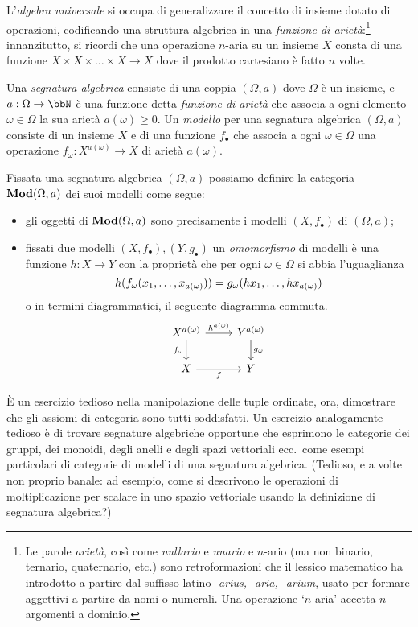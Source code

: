 L'\emph{algebra universale} si occupa di generalizzare il concetto di insieme dotato di operazioni, codificando una struttura algebrica in una \emph{funzione di arietà}:\footnote{Le parole \emph{arietà}, così come \emph{nullario} e \emph{unario} e \(n\)-ario (ma non binario, ternario, quaternario, etc.) sono retroformazioni che il lessico matematico ha introdotto a partire dal suffisso latino \emph{-\={a}rius, -\=aria, -\=arium}, usato per formare aggettivi a partire da nomi o numerali. Una operazione `\(n\)-aria' accetta \(n\) argomenti a dominio.} innanzitutto, si ricordi che una operazione \(n\)-aria su un insieme \(X\) consta di una funzione \(X\times X\times\dots\times X \to X\) dove il prodotto cartesiano è fatto \(n\) volte.
\begin{example}\label{ex_cat_sigma_strutture}
	Una \emph{segnatura algebrica} consiste di una coppia \((\Omega, a)\) dove \(\Omega\) è un insieme, e \(a : \Omega \to \bbN\) è una funzione detta \emph{funzione di arietà} che associa a ogni elemento \(\omega \in \Omega\) la sua arietà \(a(\omega)\ge 0\). Un \emph{modello} per una segnatura algebrica \((\Omega,a)\) consiste di un insieme \(X\) e di una funzione \(f_\bullet\) che associa a ogni \(\omega\in\Omega\) una operazione \(f_\omega : X^{a(\omega)} \to X\) di arietà \(a(\omega)\).

	Fissata una segnatura algebrica \((\Omega,a)\) possiamo definire la categoria \(\mathbf{Mod}(\Omega,a)\) dei suoi modelli come segue:
	\begin{itemize}
		\item gli oggetti di \(\mathbf{Mod}(\Omega,a)\) sono precisamente i modelli \((X,f_\bullet)\) di \((\Omega,a)\);
		\item fissati due modelli \((X,f_\bullet), (Y,g_\bullet)\) un \emph{omomorfismo} di modelli è una funzione \(h : X\to Y\) con la proprietà che per ogni \(\omega\in\Omega\) si abbia l'uguaglianza
		      \[h(f_\omega(\tup x{a(\omega)},)) = g_\omega(\tup {hx}{a(\omega)},)\]
		      o in termini diagrammatici, il seguente diagramma commuta.
		      \[
			      \begin{tikzcd}
				      X^{a(\omega)} \ar{r}{h^{a(\omega)}} \ar[d, "f_\omega"'] & Y^{a(\omega)} \ar{d}{g_\omega} \\
				      X \ar[r, "f"']& Y
			      \end{tikzcd}
		      \]
	\end{itemize}
\end{example}
\`E un esercizio tedioso nella manipolazione delle tuple ordinate, ora, dimostrare che gli assiomi di categoria sono tutti soddisfatti. Un esercizio analogamente tedioso è di trovare segnature algebriche opportune che esprimono le categorie dei gruppi, dei monoidi, degli anelli e degli spazi vettoriali ecc.\ come esempi particolari di categorie di modelli di una segnatura algebrica. (Tedioso, e a volte non proprio banale: ad esempio, come si descrivono le operazioni di moltiplicazione per scalare in uno spazio vettoriale usando la definizione di segnatura algebrica?)
